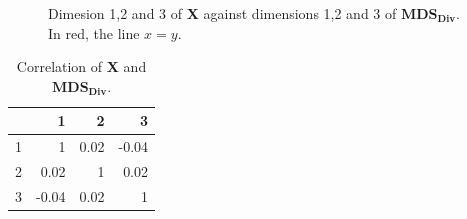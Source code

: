 \documentclass[11pt]{report}
\begin{document}
\begin{figure}[ht]
    \centering
    \qquad
    \qquad
    \caption{Dimesion 1,2 and 3 of \textbf{X} against dimensions 1,2 and 3 of  $\mathbf{MDS_{Div}}$. \newline
            In red, the line $x=y$.}%
    \label{divide_example}%
\end{figure}


\begin{table}[ht]
\centering
\begin{tabular}{rrrr}
  \hline
 & 1 & 2 & 3 \\ 
  \hline
1 & 1 & 0.02 & -0.04 \\ 
  2 & 0.02 & 1 & 0.02 \\ 
  3 & -0.04 & 0.02 & 1 \\ 
   \hline
\end{tabular}
\caption{Correlation of \textbf{X} and $\mathbf{MDS_{Div}}$.} 
\label{corr_mds}
\end{table}
\end{document}
